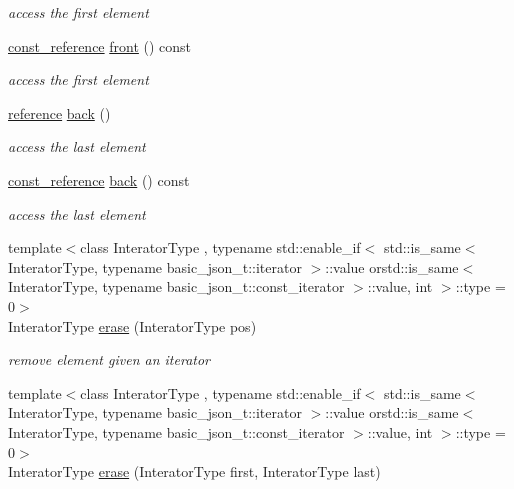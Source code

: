 \begin{DoxyCompactItemize}
\begin{DoxyCompactList}\small\item\em access the first element \end{DoxyCompactList}\item 
\hyperlink{classnlohmann_1_1basic__json_af677a29b0e66edc9f66e5167e4667071}{const\-\_\-reference} \hyperlink{classnlohmann_1_1basic__json_a8032645ce3109a7a4899badd90fa3480}{front} () const 
\begin{DoxyCompactList}\small\item\em access the first element \end{DoxyCompactList}\item 
\hyperlink{classnlohmann_1_1basic__json_a3ec8e17be8732fe436e9d6733f52b7a3}{reference} \hyperlink{classnlohmann_1_1basic__json_a71b1d38ef402dfee58fba1fe01fa67f5}{back} ()
\begin{DoxyCompactList}\small\item\em access the last element \end{DoxyCompactList}\item 
\hyperlink{classnlohmann_1_1basic__json_af677a29b0e66edc9f66e5167e4667071}{const\-\_\-reference} \hyperlink{classnlohmann_1_1basic__json_a098482190447461f47f80b99bf2519f6}{back} () const 
\begin{DoxyCompactList}\small\item\em access the last element \end{DoxyCompactList}\item 
{\footnotesize template$<$class Interator\-Type , typename std\-::enable\-\_\-if$<$ std\-::is\-\_\-same$<$ Interator\-Type, typename basic\-\_\-json\-\_\-t\-::iterator $>$\-::value orstd\-::is\-\_\-same$<$ Interator\-Type, typename basic\-\_\-json\-\_\-t\-::const\-\_\-iterator $>$\-::value, int $>$\-::type  = 0$>$ }\\Interator\-Type \hyperlink{classnlohmann_1_1basic__json_a45e789042a23138eba2b69f34df9fc45}{erase} (Interator\-Type pos)
\begin{DoxyCompactList}\small\item\em remove element given an iterator \end{DoxyCompactList}\item 
{\footnotesize template$<$class Interator\-Type , typename std\-::enable\-\_\-if$<$ std\-::is\-\_\-same$<$ Interator\-Type, typename basic\-\_\-json\-\_\-t\-::iterator $>$\-::value orstd\-::is\-\_\-same$<$ Interator\-Type, typename basic\-\_\-json\-\_\-t\-::const\-\_\-iterator $>$\-::value, int $>$\-::type  = 0$>$ }\\Interator\-Type \hyperlink{classnlohmann_1_1basic__json_a263a9ecde33a1f2ff63dcd15d5e42cb7}{erase} (Interator\-Type first, Interator\-Type last)

\end{DoxyCompactItemize}
